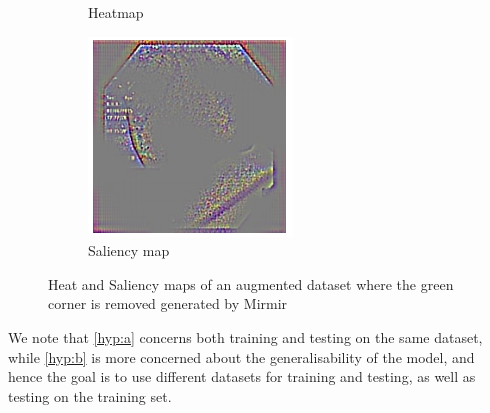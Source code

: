 \begin{figure}
\begin{subfigure}[t]{0.3\textwidth}
         \caption{Heatmap}
         \label{fig:sal5}
     \end{subfigure}     
     \hfill
     \begin{subfigure}[t]{0.3\textwidth}
         \centering
         \includegraphics[width=\textwidth]{methodology/figures/sal7.png}
         \caption{Saliency map}
         \label{fig:sal7}
     \end{subfigure}
     \caption{Heat and Saliency maps of an augmented dataset where the green corner is removed generated by Mirmir}
     \label{fig:Saliencymasks2}
\end{figure}



We note that \ref{hyp:a} concerns both training and testing on the same dataset, while \ref{hyp:b} is more concerned about the generalisability of the model, and hence the goal is to use different datasets for training and testing, as well as testing on the training set. 





